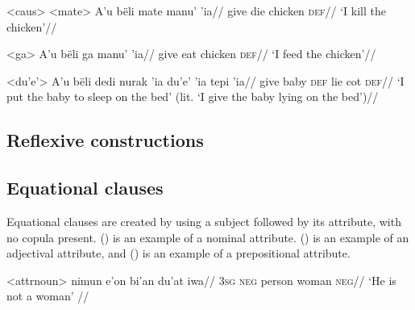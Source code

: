 \documentclass[12pt]{article}
\begin{document}
\pex<caus> %
\a<mate> %
\begingl %
\gla A'u bëli mate manu' 'ia//
\glb \First{}\Sg{} give die chicken \textsc{def}//
\glft `I kill the chicken'//
\endgl

\a<ga> %
\begingl %
\gla A'u bëli ga manu' 'ia//
\glb  \First{}\Sg{} give eat chicken \textsc{def}//
\glft `I feed the chicken'// 
\endgl

\a<du'e'> %
\begingl %
\gla A'u bëli {dedi nurak} 'ia du'e' 'ia tepi 'ia//
\glb \First{}\Sg{} give baby \textsc{def} lie \Loc{} cot \textsc{def}//
\glft `I put the baby to sleep on the bed' (lit. `I give the baby lying on the bed')// 
\endgl
\xe

\subsection{Reflexive constructions}

\subsection{Equational clauses}

Equational clauses are created by using a subject followed by its attribute, with no copula present. () is an example of a nominal attribute. () is an example of an adjectival attribute, and () is an example of a prepositional attribute. 



\ex<attrnoun>
\begingl %
\gla nimun e'on bi'an du'at iwa//
\glb \textsc{3sg} \textsc{neg} person woman \textsc{neg}//
\glft `He is not a woman' // 
\endgl %
\xe 
\end{document}
